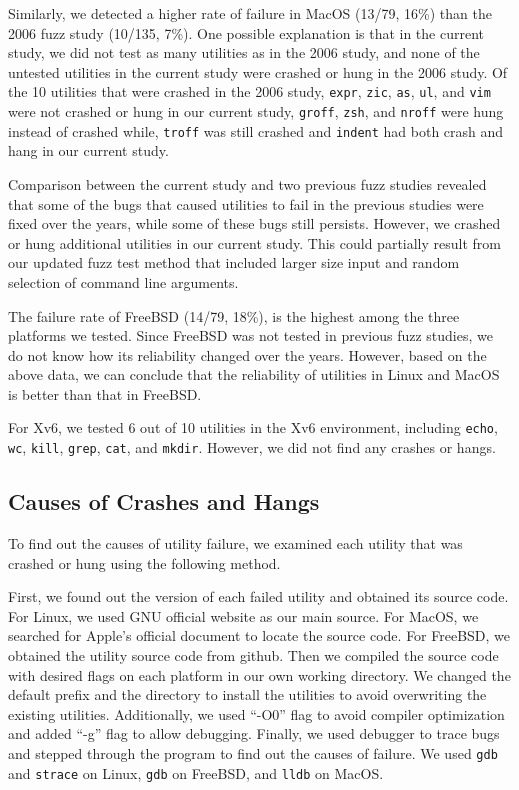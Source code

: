 Similarly, we detected a higher rate of failure in MacOS (13/79, 16\%) than the 2006 fuzz study (10/135, 7\%). One possible explanation is that in the current study, we did not test as many utilities as in the 2006 study, and none of the untested utilities in the current study were crashed or hung in the 2006 study. Of the 10 utilities that were crashed in the 2006 study, \texttt{expr}, \texttt{zic}, \texttt{as}, \texttt{ul}, and \texttt{vim} were not crashed or hung in our current study, \texttt{groff}, \texttt{zsh}, and \texttt{nroff} were hung instead of crashed while, \texttt{troff} was still crashed and \texttt{indent} had both crash and hang in our current study. 

Comparison between the current study and two previous fuzz studies revealed that some of the bugs that caused utilities to fail in the previous studies were fixed over the years, while some of these bugs still persists. However, we crashed or hung additional utilities in our current study. This could partially result from our updated fuzz test method that included larger size input and random selection of command line arguments.

The failure rate of FreeBSD (14/79, 18\%), is the highest among the three platforms we tested. Since FreeBSD was not tested in previous fuzz studies, we do not know how its reliability changed over the years. However, based on the above data, we can conclude that the reliability of utilities in Linux and MacOS is better than that in FreeBSD.

For Xv6, we tested 6 out of 10 utilities in the Xv6 environment, including \texttt{echo}, \texttt{wc}, \texttt{kill}, \texttt{grep}, \texttt{cat}, and \texttt{mkdir}. However, we did not find any crashes or hangs.



\subsection{Causes of Crashes and Hangs}
To find out the causes of utility failure, we examined each utility that was crashed or hung using the following method. 

First, we found out the version of each failed utility and obtained its source code. For Linux, we used GNU official website as our main source. For MacOS, we searched for Apple’s official document to locate the source code. For FreeBSD, we obtained the utility source code from github. Then we compiled the source code with desired flags on each platform in our own working directory. We changed the default prefix and the directory to install the utilities to avoid overwriting the existing utilities. Additionally, we used “-O0” flag to avoid compiler optimization and added “-g” flag to allow debugging. Finally, we used debugger to trace bugs and stepped through the program to find out the causes of failure. We used \texttt{gdb} and \texttt{strace} on Linux, \texttt{gdb} on FreeBSD, and \texttt{lldb} on MacOS. 

